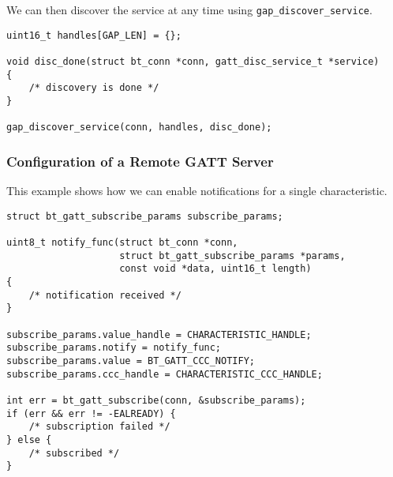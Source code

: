 We can then discover the service at any time using \texttt{gap\_discover\_service}.
\begin{lstlisting}
uint16_t handles[GAP_LEN] = {};

void disc_done(struct bt_conn *conn, gatt_disc_service_t *service)
{
    /* discovery is done */
}

gap_discover_service(conn, handles, disc_done);
\end{lstlisting}

\subsubsection{Configuration of a Remote GATT Server}
This example shows how we can enable notifications for a single characteristic.

\begin{lstlisting}
struct bt_gatt_subscribe_params subscribe_params;

uint8_t notify_func(struct bt_conn *conn,
                    struct bt_gatt_subscribe_params *params,
                    const void *data, uint16_t length)
{
    /* notification received */
}

subscribe_params.value_handle = CHARACTERISTIC_HANDLE;
subscribe_params.notify = notify_func;
subscribe_params.value = BT_GATT_CCC_NOTIFY;
subscribe_params.ccc_handle = CHARACTERISTIC_CCC_HANDLE;

int err = bt_gatt_subscribe(conn, &subscribe_params);
if (err && err != -EALREADY) {
    /* subscription failed */
} else {
    /* subscribed */
}
\end{lstlisting}

